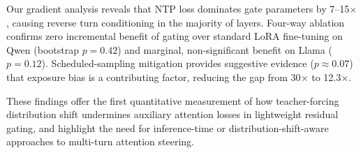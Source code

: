 \documentclass[11pt]{article}
\begin{document}
Our gradient analysis reveals that NTP loss dominates gate parameters by 7--15$\times$, causing reverse turn conditioning in the majority of layers.
Four-way ablation confirms zero incremental benefit of gating over standard LoRA fine-tuning on Qwen (bootstrap $p{=}0.42$) and marginal, non-significant benefit on Llama ($p{=}0.12$).
Scheduled-sampling mitigation provides suggestive evidence ($p{\approx}0.07$) that exposure bias is a contributing factor, reducing the gap from 30$\times$ to 12.3$\times$.

These findings offer the first quantitative measurement of how teacher-forcing distribution shift undermines auxiliary attention losses in lightweight residual gating, and highlight the need for inference-time or distribution-shift-aware approaches to multi-turn attention steering.




\end{document}
